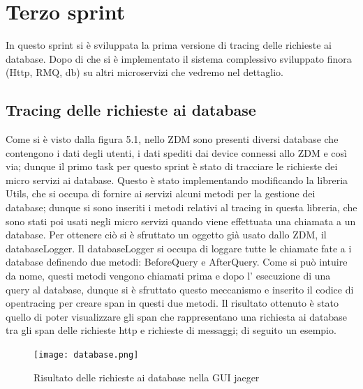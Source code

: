 \documentclass[a4paper,12pt,titlepage,italian,openany]{report}
\begin{document}
\newpage
\section{Terzo sprint}
In questo sprint si è sviluppata la prima versione di tracing delle richieste ai database. Dopo di che si è implementato il sistema complessivo sviluppato finora (Http, RMQ\cite{rabbit:1}, db) su altri microservizi che vedremo nel dettaglio.

\subsection{Tracing delle richieste ai database}
Come si è visto dalla figura 5.1, nello ZDM\cite{zdm:1} sono presenti diversi database che contengono i dati degli utenti, i dati spediti dai device connessi allo ZDM\cite{zdm:1} e così via; dunque il primo task per questo sprint è stato di 
tracciare le richieste dei micro servizi ai database. Questo è stato implementando modificando la libreria Utils, che si occupa di fornire ai servizi alcuni
 metodi per la gestione dei database; 
dunque si sono inseriti i metodi relativi al tracing in questa libreria, che sono stati poi usati negli micro 
servizi quando viene effettuata una chiamata a un database. Per ottenere ciò si è sfruttato un oggetto già usato dallo ZDM\cite{zdm:1}, il databaseLogger. Il databaseLogger si occupa di loggare tutte le chiamate fate a i database definendo due metodi: BeforeQuery e AfterQuery. 
Come si può intuire da nome, questi metodi vengono chiamati prima e dopo l' esecuzione di una query al database, dunque si è sfruttato questo meccanismo e inserito il codice di opentracing\cite{opentracing:1} per creare span in questi due metodi.
Il risultato ottenuto è stato quello di poter visualizzare gli span che rappresentano una richiesta ai database tra gli span delle richieste http e richieste di messaggi; di seguito un esempio.
\begin{figure}[H]
    \texttt{[image: database.png]}
    \centering
    \caption{Risultato delle richieste ai database nella GUI jaeger}
\end{figure}
\end{document}
